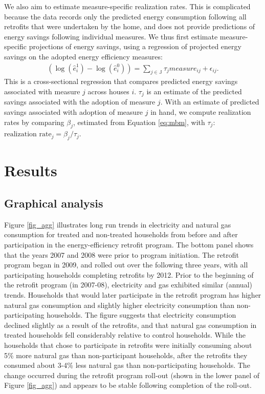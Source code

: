 \documentclass{article}
\begin{document}
We also aim to estimate measure-specific realization rates. This is complicated because the data records only the predicted energy consumption following all retrofits that were undertaken by the home, and does not provide predictions of energy savings following individual measures. We thus first estimate measure-specific projections of energy savings, using a regression of projected energy savings on the adopted energy efficiency measures:
\begin{align}
	\left(\log(\hat{e}^1_i) - \log(\hat{e}^0_i) \right) = \sum_{j \in \mathbb{J}}\tau_j measure_{ij} + \epsilon_{ij}.
\end{align}
This is a cross-sectional regression that compares predicted energy savings associated with measure $j$ across houses $i$. $\tau_j$ is an estimate of the predicted savings associated with the adoption of measure $j$. With an estimate of predicted savings associated with adoption of measure $j$ in hand, we compute realization rates by comparing $\beta_j$, estimated from Equation \eqref{eq:mbm}, with $\tau_j$: $\text{realization rate}_j=\beta_j / \tau_j$.


\section{Results}

\subsection{Graphical analysis}
Figure \ref{fig_agg} illustrates long run trends in electricity and natural gas consumption for treated and non-treated households from before and after participation in the energy-efficiency retrofit program. The bottom panel shows that the years 2007 and 2008 were prior to program initiation. The retrofit program began in 2009, and rolled out over the following three years, with all participating households completing retrofits by 2012. Prior to the beginning of the retrofit program (in 2007-08), electricity and gas exhibited similar (annual) trends. Households that would later participate in the retrofit program has higher natural gas consumption and slightly higher electricity consumption than non-participating households. The figure suggests that electricity consumption declined slightly as a result of the retrofits, and that natural gas consumption in treated households fell considerably relative to control households. While the households that chose to participate in retrofits were initially consuming about 5\% more natural gas than non-participant households, after the retrofits they consumed about 3-4\% less natural gas than non-participating households. The change occurred during the retrofit program roll-out (shown in the lower panel of Figure \ref{fig_agg}) and appears to be stable following completion of the roll-out.
\end{document}
